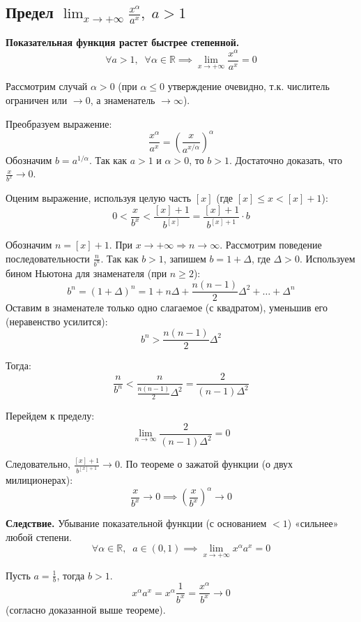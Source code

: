 \subsection{Предел $\lim_{x \to +\infty} \frac{x^\alpha}{a^x},\; a>1$}

\textbf{Показательная функция растет быстрее степенной.}
\[ \forall a > 1, \;\; \forall \alpha \in \mathbb{R} \implies \lim_{x \to +\infty} \frac{x^\alpha}{a^x} = 0 \]

\begin{tcolorbox}[title=Доказательство]
	Рассмотрим случай $\alpha > 0$ (при $\alpha \le 0$ утверждение очевидно, т.к. числитель ограничен или $\to 0$, а знаменатель $\to \infty$).
	
	Преобразуем выражение:
	\[ \frac{x^\alpha}{a^x} = \left( \frac{x}{a^{x/\alpha}} \right)^\alpha \]
	Обозначим $b = a^{1/\alpha}$. Так как $a > 1$ и $\alpha > 0$, то $b > 1$.
	Достаточно доказать, что $\frac{x}{b^x} \to 0$.
	
	Оценим выражение, используя целую часть $[x]$ (где $[x] \le x < [x] + 1$):
	\[ 0 < \frac{x}{b^x} < \frac{[x] + 1}{b^{[x]}} = \frac{[x] + 1}{b^{[x]+1}} \cdot b \]
	
	Обозначим $n = [x] + 1$. При $x \to +\infty \Rightarrow n \to \infty$.
	Рассмотрим поведение последовательности $\frac{n}{b^n}$.
	Так как $b > 1$, запишем $b = 1 + \Delta$, где $\Delta > 0$.
	Используем бином Ньютона для знаменателя (при $n \ge 2$):
	\[ b^n = (1 + \Delta)^n = 1 + n\Delta + \frac{n(n-1)}{2}\Delta^2 + \dots + \Delta^n \]
	Оставим в знаменателе только одно слагаемое (с квадратом), уменьшив его (неравенство усилится):
	\[ b^n > \frac{n(n-1)}{2}\Delta^2 \]
	
	Тогда:
	\[ \frac{n}{b^n} < \frac{n}{\frac{n(n-1)}{2}\Delta^2} = \frac{2}{(n-1)\Delta^2} \]
	
	Перейдем к пределу:
	\[ \lim_{n \to \infty} \frac{2}{(n-1)\Delta^2} = 0 \]
	
	Следовательно, $\frac{[x]+1}{b^{[x]+1}} \to 0$.
	По теореме о зажатой функции (о двух милиционерах):
	\[ \frac{x}{b^x} \to 0 \implies \left(\frac{x}{b^x}\right)^\alpha \to 0 \]
\end{tcolorbox}

\textbf{Следствие.} Убывание показательной функции (с основанием $<1$) «сильнее» любой степени.
\[ \forall \alpha \in \mathbb{R}, \;\; a \in (0, 1) \implies \lim_{x \to +\infty} x^\alpha a^x = 0 \]

\begin{tcolorbox}[title=Пояснение (из следствия 1)]
	Пусть $a = \frac{1}{b}$, тогда $b > 1$.
	\[ x^\alpha a^x = x^\alpha \frac{1}{b^x} = \frac{x^\alpha}{b^x} \to 0 \]
	(согласно доказанной выше теореме).
\end{tcolorbox}
